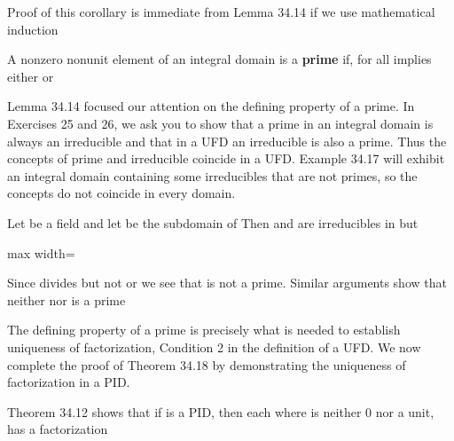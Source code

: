 \documentclass[11pt,oneside]{article}
\begin{document}
\begin{BookBody}

 Proof of this corollary is immediate from Lemma 34.14 if we use mathematical induction\BookEnd{\blacklozenge}

 A nonzero nonunit element  of an integral domain  is a\textbf{ prime} if, for all   implies either  or \BookEnd{\blacksquare}

Lemma 34.14 focused our attention on the defining property of a prime. In Exercises 25 and 26, we ask you to show that a prime in an integral domain is always an irreducible and that in a UFD an irreducible is also a prime. Thus the concepts of prime and irreducible coincide in a UFD. Example 34.17 will exhibit an integral domain containing some irreducibles that are not primes, so the concepts do not coincide in every domain.

 Let  be a field and let  be the subdomain  of  Then  and  are irreducibles in  but

\begin{center}\begin{adjustbox}{max width=\linewidth}\end{adjustbox}\end{center}

\noindent Since  divides  but not  or  we see that  is not a prime. Similar arguments show that neither  nor  is a prime\BookEnd{\blacktriangle}

The defining property of a prime is precisely what is needed to establish uniqueness of factorization, Condition 2 in the definition of a UFD. We now complete the proof of Theorem 34.18 by demonstrating the uniqueness of factorization in a PID.



 Theorem 34.12 shows that if  is a PID, then each  where  is neither 0 nor a unit, has a factorization


\end{BookBody}
\end{document}
